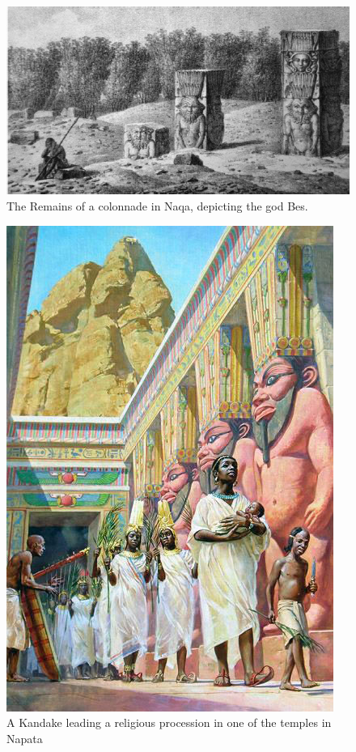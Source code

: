 \documentclass[a4paper,12pt]{scrreprt}
\begin{document}
\begin{figure}[H]
	\centering
	\includegraphics[width=\textwidth]{img/remains_colonnade_naqa}
	\caption{The Remains of a colonnade in Naqa, depicting the god Bes.}
\end{figure}

\begin{figure}[H]
	\centering
	\includegraphics[width=\textwidth]{img/kandake_religious_procession}
	\caption{A Kandake leading a religious procession in one of the temples in Napata}
\end{figure}
\end{document}
